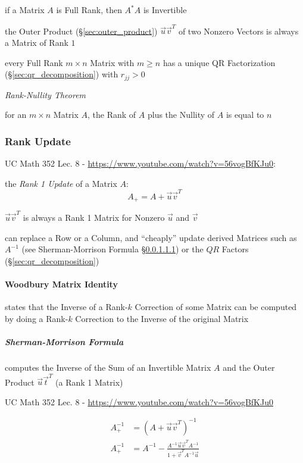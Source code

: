 if a Matrix $A$ is Full Rank, then $A^*A$ is Invertible

the Outer Product (\S\ref{sec:outer_product}) $\vec{u}\vec{v}^T$ of two Nonzero
Vectors is always a Matrix of Rank $1$

every Full Rank $m \times n$ Matrix with $m \geq n$ has a unique QR
Factorization (\S\ref{sec:qr_decomposition}) with $r_{jj} > 0$

\emph{Rank-Nullity Theorem}

for an $m \times n$ Matrix $A$, the Rank of $A$ plus the Nullity of $A$ is
equal to $n$



\subsubsection{Rank Update}\label{sec:rank_update}

UC Math 352 Lec. 8 - \url{https://www.youtube.com/watch?v=56vogBfKJu0}:

the \emph{Rank 1 Update} of a Matrix $A$:
\[
  A_+ = A + \vec{u}\vec{v}^T
\]

$\vec{u}\vec{v}^T$ is always a Rank 1 Matrix for Nonzero $\vec{u}$ and
$\vec{v}$

can replace a Row or a Column, and ``cheaply'' update derived Matrices such as
$A^{-1}$ (see Sherman-Morrison Formula \S\ref{sec:sherman_morrison}) or the
$QR$ Factors (\S\ref{sec:qr_decomposition})



\paragraph{Woodbury Matrix Identity}\label{sec:woodbury_matrix_identity}\hfill

states that the Inverse of a Rank-$k$ Correction of some Matrix can be computed
by doing a Rank-$k$ Correction to the Inverse of the original Matrix



\subparagraph{Sherman-Morrison Formula}\label{sec:sherman_morrison}\hfill

computes the Inverse of the Sum of an Invertible Matrix $A$ and the Outer
Product $\vec{u}\vec{t}^T$ (a Rank 1 Matrix)

UC Math 352 Lec. 8 - \url{https://www.youtube.com/watch?v=56vogBfKJu0}

\begin{align*}
  A_+^{-1} & = (A + \vec{u}\vec{v}^T)^{-1} \\
  A_+^{-1} & = A^{-1} -
    \frac{A^{-1}\vec{u}\vec{v}^TA^{-1}}{1 + \vec{v}^TA^{-1}\vec{u}}
\end{align*}

